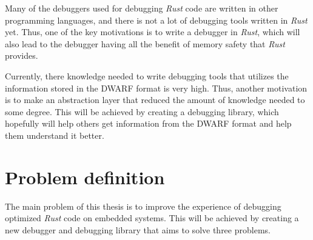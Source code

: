 Many of the debuggers used for debugging \emph{Rust} code are written in other programming languages, and there is not a lot of debugging tools written in \emph{Rust} yet.
Thus, one of the key motivations is to write a debugger in \emph{Rust}, which will also lead to the debugger having all the benefit of memory safety that \emph{Rust} provides.


Currently, there knowledge needed to write debugging tools that utilizes the information stored in the \gls{DWARF} format is very high.
Thus, another motivation is to make an abstraction layer that reduced the amount of knowledge needed to some degree.
This will be achieved by creating a debugging library, which hopefully will help others get information from the \gls{DWARF} format and help them understand it better.


\section{Problem definition} \label{sec:problemDef}
 

The main problem of this thesis is to improve the experience of debugging optimized \emph{Rust} code on embedded systems.
This will be achieved by creating a new debugger and debugging library that aims to solve three problems.


